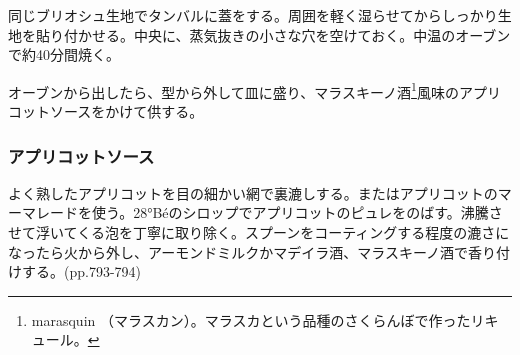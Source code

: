\begin{recette}
同じブリオシュ生地でタンバルに蓋をする。周囲を軽く湿らせてからしっかり生地を貼り付かせる。中央に、蒸気抜きの小さな穴を空けておく。中温のオーブンで約40分間焼く。

オーブンから出したら、型から外して皿に盛り、マラスキーノ酒\footnote{marasquin
  （マラスカン）。マラスカという品種のさくらんぼで作ったリキュール。}風味のアプリコットソースをかけて供する。

\hypertarget{sauce-a-l-abricot}{%
\subsubsection{アプリコットソース}\label{sauce-a-l-abricot}}


よく熟したアプリコットを目の細かい網で裏漉しする。またはアプリコットのマーマレードを使う。28°Béのシロップでアプリコットのピュレをのばす。沸騰させて浮いてくる泡を丁寧に取り除く。スプーンをコーティングする程度の漉さになったら火から外し、アーモンドミルクかマデイラ酒、マラスキーノ酒で香り付けする。(pp.793-794)
\end{recette}
